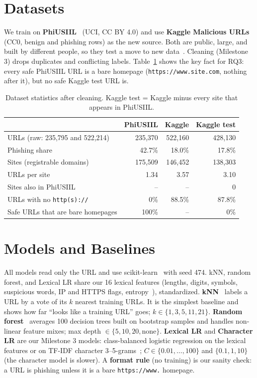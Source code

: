 \documentclass[sigconf,nonacm]{acmart}
\begin{document}
\section{Datasets}
We train on \textbf{PhiUSIIL}~\cite{phius} (UCI, CC BY 4.0) and use \textbf{Kaggle Malicious URLs}~\cite{kaggle} (CC0, benign and phishing rows) as the new source. Both are public, large, and built by different people, so they test a move to new data~\cite{rashid}. Cleaning (Milestone 3) drops duplicates and conflicting labels. Table~\ref{tab:data} shows the key fact for RQ3: every safe PhiUSIIL URL is a bare homepage (\texttt{https://www.site.com}, nothing after it), but no safe Kaggle test URL is.

\begin{table}[t]
\caption{Dataset statistics after cleaning. Kaggle test = Kaggle minus every site that appears in PhiUSIIL.}\label{tab:data}
\vspace{-8pt}
\scriptsize\setlength{\tabcolsep}{4pt}
\begin{tabular}{@{}lrrr@{}}
\toprule
 & PhiUSIIL & Kaggle & Kaggle test\\
\midrule
URLs (raw: 235,795 and 522,214) & 235,370 & 522,160 & 428,130\\
Phishing share & 42.7\% & 18.0\% & 17.8\%\\
Sites (registrable domains) & 175,509 & 146,452 & 138,303\\
URLs per site & 1.34 & 3.57 & 3.10\\
Sites also in PhiUSIIL & -- & -- & 0\\
URLs with no \texttt{http(s)://} & 0\% & 88.5\% & 87.8\%\\
Safe URLs that are bare homepages & 100\% & -- & 0\%\\
\bottomrule
\end{tabular}
\end{table}

\section{Models and Baselines}
All models read only the URL and use scikit-learn~\cite{sklearn} with seed 474. kNN, random forest, and Lexical LR share our 16 lexical features (lengths, digits, symbols, suspicious words, IP and HTTPS flags, entropy~\cite{sahingoz}), standardized.
\textbf{kNN}~\cite{knn} labels a URL by a vote of its $k$ nearest training URLs. It is the simplest baseline and shows how far ``looks like a training URL'' goes; $k\in\{1,3,5,11,21\}$.
\textbf{Random forest}~\cite{rf} averages 100 decision trees built on bootstrap samples and handles non-linear feature mixes; max depth $\in\{5,10,20,\text{none}\}$.
\textbf{Lexical LR} and \textbf{Character LR} are our Milestone 3 models: class-balanced logistic regression on the lexical features or on TF-IDF character 3--5-grams~\cite{bahnsen}; $C\in\{0.01,\dots,100\}$ and $\{0.1,1,10\}$ (the character model is slower).
A \textbf{format rule} (no training) is our sanity check: a URL is phishing unless it is a bare \texttt{https://www.} homepage.
\end{document}
